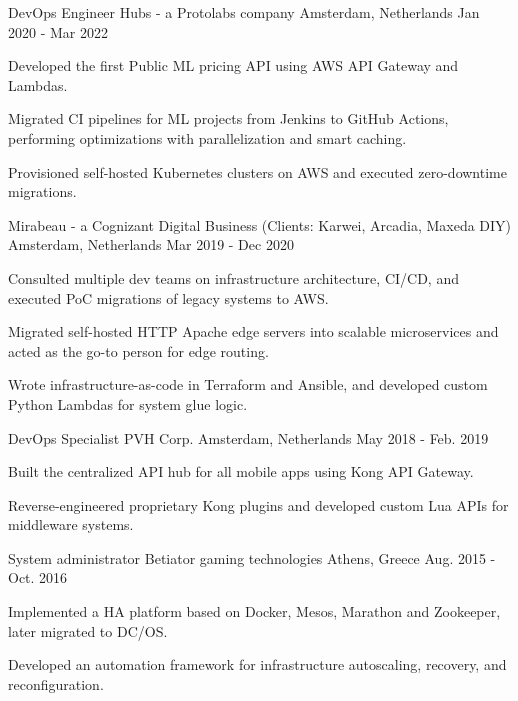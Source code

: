 \begin{cventries}
\cventry
{DevOps Engineer}
{Hubs - a Protolabs company}
{Amsterdam, Netherlands}
{Jan 2020 - Mar 2022}
{
	\begin{cvitems}
		\item {Developed the first Public ML pricing API using AWS API Gateway and Lambdas.}
		\item {Migrated CI pipelines for ML projects from Jenkins to GitHub Actions, performing optimizations with parallelization and smart caching.}
		\item {Provisioned self-hosted Kubernetes clusters on AWS and executed zero-downtime migrations.}
	\end{cvitems}
}

{Mirabeau - a Cognizant Digital Business (Clients: Karwei, Arcadia, Maxeda DIY)}
{Amsterdam, Netherlands}
{Mar 2019 - Dec 2020}
{
	\begin{cvitems}
		\item {Consulted multiple dev teams on infrastructure architecture, CI/CD, and executed PoC migrations of legacy systems to AWS.}
		\item {Migrated self-hosted HTTP Apache edge servers into scalable microservices and acted as the go-to person for edge routing.}
		\item {Wrote infrastructure-as-code in Terraform and Ansible, and developed custom Python Lambdas for system glue logic.}
	\end{cvitems}
}

\cventry
{DevOps Specialist}
{PVH Corp.}
{Amsterdam, Netherlands}
{May 2018 - Feb. 2019}
{
	\begin{cvitems}
	\item {Built the centralized API hub for all mobile apps using Kong API Gateway.}
	\item {Reverse-engineered proprietary Kong plugins and developed custom Lua APIs for middleware systems.}
	\end{cvitems}
}

\cventry
{System administrator}
{Betiator gaming technologies}
{Athens, Greece}
{Aug. 2015 - Oct. 2016}
{
\begin{cvitems}
\item {Implemented a HA platform based on Docker, Mesos, Marathon and Zookeeper, later migrated to DC/OS.}
\item {Developed an automation framework for infrastructure autoscaling, recovery, and reconfiguration.}
\end{cvitems}
}

\end{cventries}
